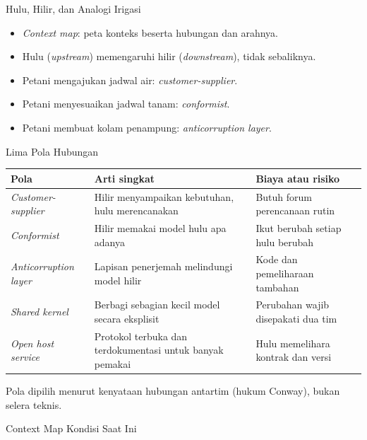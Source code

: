 \documentclass[aspectratio=169, table, 12pt]{beamer}
\begin{document}
\begin{frame}{{\Large Hulu, Hilir, dan Analogi Irigasi}}
  \vspace{10pt}
  \begin{itemize}
    \item \textit{Context map}: peta konteks beserta hubungan dan arahnya.
    \item Hulu (\textit{upstream}) memengaruhi hilir (\textit{downstream}), tidak
          sebaliknya.
    \item Petani mengajukan jadwal air: \textit{customer-supplier}.
    \item Petani menyesuaikan jadwal tanam: \textit{conformist}.
    \item Petani membuat kolam penampung: \textit{anticorruption layer}.
  \end{itemize}
\end{frame}

\begin{frame}{{\Large Lima Pola Hubungan}}
  \scriptsize
  \begin{tabularx}{\textwidth}{>{\raggedright\arraybackslash}p{3.1cm}
      >{\raggedright\arraybackslash}X >{\raggedright\arraybackslash}X}
    \hline
    \textbf{Pola} & \textbf{Arti singkat} & \textbf{Biaya atau risiko} \\
    \hline
    \textit{Customer-supplier} & Hilir menyampaikan kebutuhan, hulu merencanakan &
      Butuh forum perencanaan rutin \\
    \hline
    \textit{Conformist} & Hilir memakai model hulu apa adanya & Ikut berubah setiap
      hulu berubah \\
    \hline
    \textit{Anticorruption layer} & Lapisan penerjemah melindungi model hilir & Kode
      dan pemeliharaan tambahan \\
    \hline
    \textit{Shared kernel} & Berbagi sebagian kecil model secara eksplisit &
      Perubahan wajib disepakati dua tim \\
    \hline
    \textit{Open host service} & Protokol terbuka dan terdokumentasi untuk banyak
      pemakai & Hulu memelihara kontrak dan versi \\
    \hline
  \end{tabularx}

  \vspace{8pt}
  \small
  Pola dipilih menurut kenyataan hubungan antartim (hukum Conway), bukan selera
  teknis.
\end{frame}

\begin{frame}{{\Large Context Map Kondisi Saat Ini}}
  \centering
\end{frame}
\end{document}
